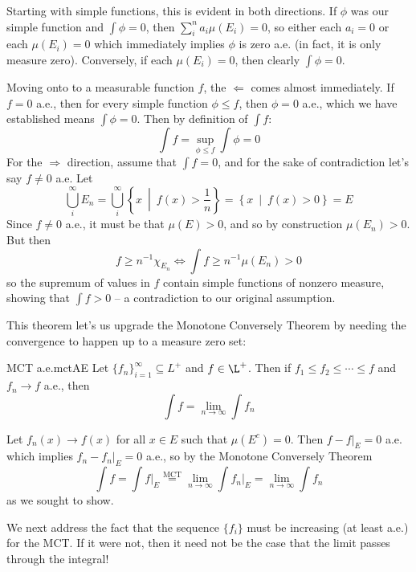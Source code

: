 \documentclass[oneside]{book}
\newcommand{\sse}{\subseteq}
\newcommand{\set}[2]{\left\{#1 \ \middle|\ #2\right\}}
\newcommand{\rw}{\rightarrow}
\newcommand{\Rw}{\Rightarrow}
\newcommand{\Lw}{\Leftarrow}
\newcommand{\LRw}{\Leftrightarrow}
\begin{document}
\begin{Proof}
	Starting with simple functions, this is evident in both directions. If $\phi$ was our simple function and $\int \phi
	= 0$, then $\sum_i^n a_i\mu(E_i) = 0$, so either each $a_i = 0$ or each $\mu(E_i) = 0$ which immediately implies
	$\phi$ is zero a.e. (in fact, it is only measure zero). Conversely, if each $\mu(E_i) = 0$, then clearly
	$\int \phi = 0$. 

	Moving onto to a measurable function $f$, the $\Lw$ comes almost immediately. If $f = 0$ a.e., then for every simple
	function $\phi \le  f$, then $\phi = 0$ a.e., which we have established means $\int \phi = 0$. Then by definition of
	$\int f$:
	\[
		\int f = \sup_{\phi \le f} \int \phi = 0
	\]
	For the $\Rw$ direction, assume that $\int f = 0$, and for the sake of contradiction let's say $f \ne 0$ a.e. Let
	\[
		\bigcup_i^\infty E_n =\bigcup_i^\infty \set{x}{f(x) > \frac{1}{n}} = \set{x}{f(x) > 0} = E
	\]
	Since $f \ne 0$ a.e., it must be that $\mu(E) > 0$, and so by construction $\mu(E_n) > 0$. But then
	\[
		f \ge n^{-1}\chi_{E_n} \LRw \int f \ge n^{-1}\mu(E_n) > 0
	\]
	so the supremum of values in $f$ contain simple functions of nonzero measure, showing that $\int f > 0$ --
	a contradiction to our original assumption. 
\end{Proof}

This theorem let's us upgrade the Monotone Conversely Theorem by needing the convergence to happen up to a measure zero
set:

\begin{cor}{MCT a.e.}{mctAE}
	Let $\{f_n\}_{i=1}^\infty \sse L^+$ and $f \in \L^+$. Then if $f_1 \le f_2 \le \cdots \le f$ and $f_n \rw f$ a.e.,
	then 
	\[
		\int f = \lim_{n \rw \infty} \int f_n
	\]
\end{cor}


\begin{Proof}
	Let $f_n(x) \rw f(x)$ for all $x \in E$ such that $\mu(E^c) = 0$. Then $f - \left.f\right|_E = 0$ a.e. which implies
		$f_n - \left. f_n\right|_E = 0$ a.e., so by the Monotone Conversely Theorem
		\[
			\int f = \int \left. f\right|_E \overset{\text{MCT}}{=} \lim_{n \rw \infty}\int \left.f_n\right|_E = \lim_{n
					\rw \infty}\int f_n
			\]
			as we sought to show.
\end{Proof}

We next address the fact that the sequence $\{f_i\}$ must be increasing (at least a.e.) for the MCT. If it were not,
then it need not be the case that the limit passes through the integral!
\end{document}
